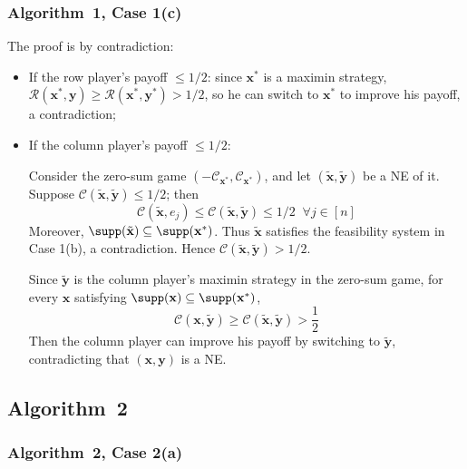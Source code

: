 \subsubsection{Algorithm~1, Case 1(c)}
\label{app:case-one-both-high}

The proof is by contradiction:

\begin{itemize}
  \item If the row player's payoff \(\le 1/2\): since \(\mathbf{x}^*\) is a maximin strategy, \(\mathcal{R}(\mathbf{x}^*, \mathbf{y}) \ge \mathcal{R}(\mathbf{x}^*, \mathbf{y}^*) > 1/2\), so he can switch to \(\mathbf{x}^*\) to improve his payoff, a contradiction;

  \item If the column player's payoff \(\le 1/2\):

        Consider the zero-sum game \((-\mathcal{C}_{\mathbf{x}^*}, \mathcal{C}_{\mathbf{x}^*})\), and let \((\tilde{\mathbf{x}}, \tilde{\mathbf{y}})\) be a NE of it. Suppose \(\mathcal{C}(\tilde{\mathbf{x}}, \tilde{\mathbf{y}}) \le 1/2\); then
        \[
          \mathcal{C}(\tilde{\mathbf{x}}, e_j) \le \mathcal{C}(\tilde{\mathbf{x}}, \tilde{\mathbf{y}}) \le 1/2 \;\; \forall j \in [n]
        \]
        Moreover, \(\supp(\tilde{\mathbf{x}}) \subseteq \supp(\mathbf{x}^*)\). Thus \(\tilde{\mathbf{x}}\) satisfies the feasibility system in Case 1(b), a contradiction. Hence \(\mathcal{C}(\tilde{\mathbf{x}}, \tilde{\mathbf{y}}) > 1/2\).

        Since \(\tilde{\mathbf{y}}\) is the column player's maximin strategy in the zero-sum game, for every \(\mathbf{x}\) satisfying \(\supp(\mathbf{x}) \subseteq \supp(\mathbf{x}^*)\),
        \[
          \mathcal{C}(\mathbf{x}, \tilde{\mathbf{y}}) \ge \mathcal{C}(\tilde{\mathbf{x}}, \tilde{\mathbf{y}}) > \frac{1}{2}
        \]
        Then the column player can improve his payoff by switching to \(\tilde{\mathbf{y}}\), contradicting that \((\mathbf{x}, \mathbf{y})\) is a NE.
\end{itemize}

\subsection{Algorithm~2}
\label{app:case-analysis-details-algo-2}

\subsubsection{Algorithm~2, Case 2(a)}
\label{app:case-two-low}

